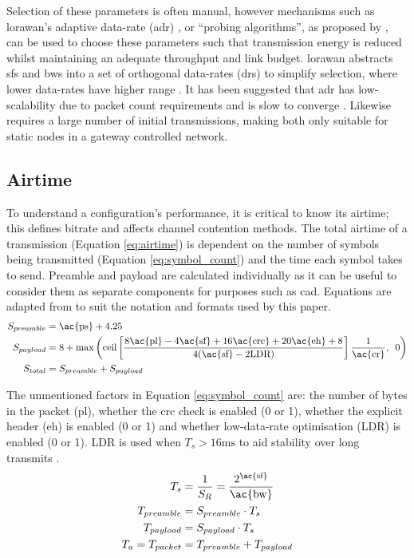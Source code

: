 Selection of these parameters is often manual, however mechanisms such as \ac{lorawan}'s adaptive data-rate (\ac{adr}) \cite{3YP:LORAWAN}, or ``probing algorithms'', as proposed by \cite{3YP:CHOOSING_LORA_PARAMETERS}, can be used to choose these parameters such that transmission energy is reduced whilst maintaining an adequate throughput and link budget. \ac{lorawan} abstracts \ac{sf}s and \ac{bw}s into a set of orthogonal data-rates (\ac{dr}s) to simplify selection, where lower data-rates have higher range \cite{3YP:LORAWAN_REGIONAL_PARAMS}. It has been suggested that \ac{adr} has low-scalability due to packet count requirements \cite{3YP:LORAWAN_ADR} and is slow to converge \cite{3YP:LORAWAN_ADR_AGILITY}. Likewise \cite{3YP:CHOOSING_LORA_PARAMETERS} requires a large number of initial transmissions, making both only suitable for static nodes in a gateway controlled network.

\subsection{Airtime}\label{sec:airtime}
To understand a configuration's performance, it is critical to know its airtime; this defines bitrate and affects channel contention methods. The total airtime of a transmission (Equation \ref{eq:airtime}) is dependent on the number of symbols being transmitted (Equation \ref{eq:symbol_count}) and the time each symbol takes to send. Preamble and payload are calculated individually as it can be useful to consider them as separate components for purposes such as \ac{cad}. Equations are adapted from \cite{3YP:LORA_SX12} to suit the notation and formats used by this paper.
\begin{subequations}
\label{eq:symbol_count}
\begin{align}
	S_{preamble} &= \text{\ac{ps}} + 4.25 \\
	S_{payload} &= 8 + \max\left( \text{ceil}\left[ \frac{8\text{\ac{pl}}-4\text{\ac{sf}}+16\text{\ac{crc}}+20\text{\ac{eh}}+8}{4(\text{\ac{sf}}-2\text{LDR})}\right] \frac{1}{\text{\ac{cr}}},\enskip 0\right) \\
	S_{total} &= S_{preamble} + S_{payload} 
\end{align}
\end{subequations}

The unmentioned factors in Equation \ref{eq:symbol_count} are: the number of bytes in the packet (\ac{pl}), whether the \ac{crc} check is enabled (0 or 1), whether the explicit header (\ac{eh}) is enabled (0 or 1) and whether low-data-rate optimisation (LDR) is enabled (0 or 1). LDR is used when $T_s > 16\text{ms}$ to aid stability over long transmits \cite{3YP:LORA_SX12}.
\begin{subequations}
\label{eq:airtime}
\begin{align}
	T_{s} &= \frac{1}{S_R} = \frac{2^{\text{\ac{sf}}}}{\text{\ac{bw}}}\label{eq:symbol_time} \\
	T_{preamble} &=  S_{preamble}\cdot T_{s}\\
	T_{payload} &= S_{payload}\cdot T_{s} \\
	T_{a} = T_{packet} &= T_{preamble} + T_{payload}
\end{align}
\end{subequations}

